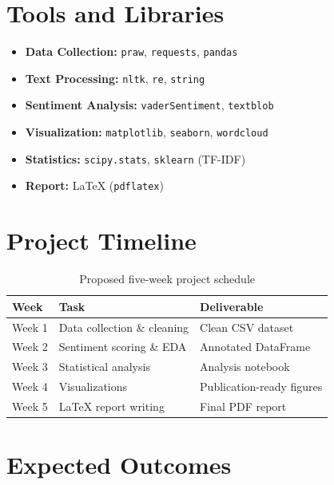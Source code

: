 \documentclass[12pt, letterpaper]{article}
\begin{document}
\section{Tools and Libraries}

\begin{itemize}[noitemsep]
    \item \textbf{Data Collection:} \texttt{praw}, \texttt{requests}, \texttt{pandas}
    \item \textbf{Text Processing:} \texttt{nltk}, \texttt{re}, \texttt{string}
    \item \textbf{Sentiment Analysis:} \texttt{vaderSentiment}, \texttt{textblob}
    \item \textbf{Visualization:} \texttt{matplotlib}, \texttt{seaborn}, \texttt{wordcloud}
    \item \textbf{Statistics:} \texttt{scipy.stats}, \texttt{sklearn} (TF-IDF)
    \item \textbf{Report:} \LaTeX{} (\texttt{pdflatex})
\end{itemize}

\section{Project Timeline}

\begin{table}[h!]
\centering
\renewcommand{\arraystretch}{1.4}
\begin{tabular}{@{}lll@{}}
\toprule
\textbf{Week} & \textbf{Task} & \textbf{Deliverable} \\
\midrule
Week 1 & Data collection \& cleaning & Clean CSV dataset \\
Week 2 & Sentiment scoring \& EDA & Annotated DataFrame \\
Week 3 & Statistical analysis & Analysis notebook \\
Week 4 & Visualizations & Publication-ready figures \\
Week 5 & LaTeX report writing & Final PDF report \\
\bottomrule
\end{tabular}
\caption{Proposed five-week project schedule}
\end{table}

\section{Expected Outcomes}
\end{document}
